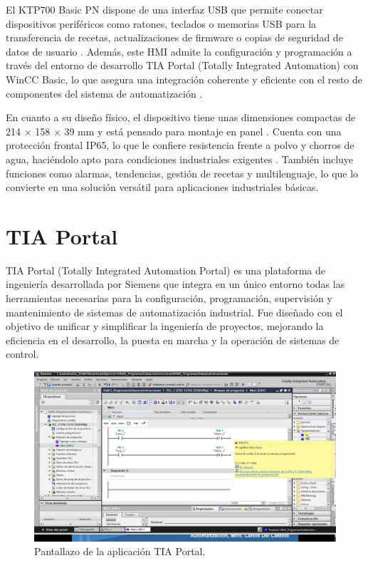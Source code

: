 El KTP700 Basic PN dispone de una interfaz USB que permite conectar dispositivos periféricos como ratones, teclados o memorias USB para la transferencia de recetas, actualizaciones de firmware o copias de seguridad de datos de usuario \cite{HMI_KTP}. Además, este HMI admite la configuración y programación a través del entorno de desarrollo TIA Portal (Totally Integrated Automation) con WinCC Basic, lo que asegura una integración coherente y eficiente con el resto de componentes del sistema de automatización \cite{HMI_KTP}.

En cuanto a su diseño físico, el dispositivo tiene unas dimensiones compactas de 214 × 158 × 39 mm y está pensado para montaje en panel \cite{HMI_KTP}. Cuenta con una protección frontal IP65, lo que le confiere resistencia frente a polvo y chorros de agua, haciéndolo apto para condiciones industriales exigentes \cite{HMI_KTP}. También incluye funciones como alarmas, tendencias, gestión de recetas y multilenguaje, lo que lo convierte en una solución versátil para aplicaciones industriales básicas.

\section{TIA Portal}
\label{sec:tia_portal}

TIA Portal (Totally Integrated Automation Portal) es una plataforma de ingeniería desarrollada por Siemens que integra en un único entorno todas las herramientas necesarias para la configuración, programación, supervisión y mantenimiento de sistemas de automatización industrial. Fue diseñado con el objetivo de unificar y simplificar la ingeniería de proyectos, mejorando la eficiencia en el desarrollo, la puesta en marcha y la operación de sistemas de control.

\begin{figure} [h!]
  \begin{center}
    \includegraphics[width=14cm]{figs/TIA_portal}
  \end{center}
  \caption{\centering Pantallazo de la aplicación TIA Portal.}
  \label{fig:TIA_portal}
\end{figure} 

